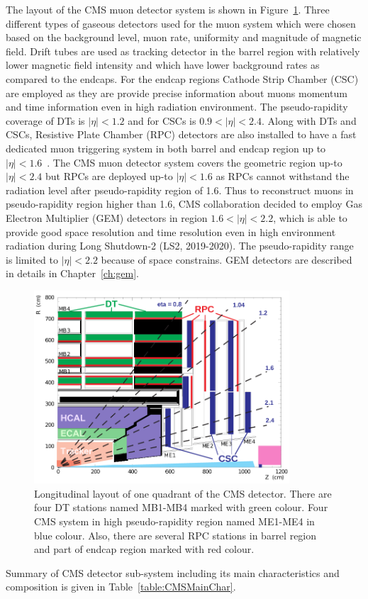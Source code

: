 The layout of the CMS muon detector system is shown in Figure~\ref{fig:muon-system-layout}. Three different types of gaseous detectors used for the muon system which were chosen based on the background level, muon rate, uniformity and magnitude of magnetic field. Drift tubes are used as tracking detector in the barrel region with relatively lower magnetic field intensity and which have lower background rates as compared to the endcaps. 
For the endcap regions Cathode Strip Chamber (CSC) are employed as they are provide precise information about muons momentum and time information even in high radiation environment. The pseudo-rapidity coverage of DTs is $|\eta|<1.2$ and for CSCs is $0.9<|\eta|<2.4$. Along with DTs and CSCs, Resistive Plate Chamber (RPC) detectors are also installed to have a fast dedicated  muon triggering system in both barrel and endcap region up to $|\eta|<1.6$~\cite{muon-tdr}. The CMS muon detector system covers the geometric region up-to $|\eta|<2.4$ but RPCs are deployed up-to $|\eta|<1.6$ as RPCs cannot withstand the radiation level after pseudo-rapidity region of 1.6. Thus to reconstruct muons in pseudo-rapidity region higher than 1.6, CMS collaboration decided to employ Gas Electron Multiplier (GEM) detectors in region  $1.6<|\eta|<2.2$, which is able to provide good space resolution and time resolution even in high environment radiation during Long Shutdown-2 (LS2, 2019-2020). The pseudo-rapidity range is limited to $|\eta|<2.2$ because of space constrains. GEM  detectors are described in details in Chapter~\ref{ch:gem}.
\begin{figure}[!htbp]
	\centering
	\includegraphics[width=0.85\textwidth]{figures/LHC/pictures_MuonSys-mod3.png}
	\caption{Longitudinal layout of one quadrant of the CMS detector. There are four DT stations named MB1-MB4 marked with green colour. Four CMS system in high pseudo-rapidity region named ME1-ME4 in blue colour. Also, there are several RPC stations in barrel region and part of endcap region marked with red colour.}
	\label{fig:muon-system-layout}
\end{figure}
Summary of CMS detector sub-system including its main characteristics and composition is given in Table~\ref{table:CMSMainChar}.

